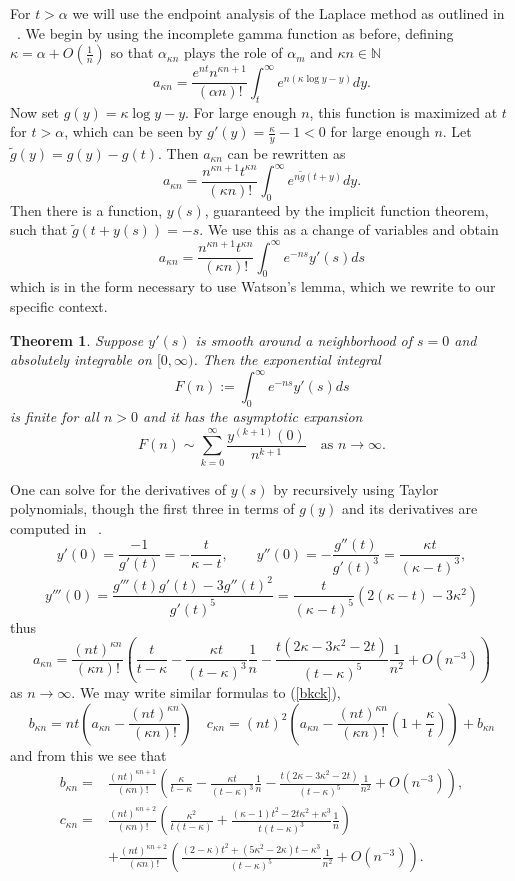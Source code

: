 \documentclass[12pt]{amsart}
\newtheorem{theorem}{Theorem}
\theoremstyle{remark}
\begin{document}
For $t>\alpha$ we will use the endpoint analysis of the Laplace method as outlined in ~\cite[\S3.3]{Miller}.  We begin by using the incomplete gamma function as before, defining $\kappa=\alpha+O(\frac{1}{n})$ so that $\alpha_{\kappa n}$ plays the role of $\alpha_m$ and $\kappa n\in\mathbb{N}$
\[a_{\kappa n}=\frac{e^{nt}n^{\kappa n+1}}{(\alpha n)!}\int_{t}^\infty e^{n(\kappa\log y-y)}dy.\]
Now set $g(y)=\kappa\log y-y$.  For large enough $n$, this function is maximized at $t$ for $t>\alpha$, which can be seen by $g'(y)=\frac{\kappa}{y}-1<0$ for large enough $n$.  Let $\tilde{g}(y)=g(y)-g(t)$.  Then $a_{\kappa n}$ can be rewritten as
\[a_{\kappa n}=\frac{n^{\kappa n+1}t^{\kappa n}}{(\kappa n)!}\int_{0}^\infty e^{n\tilde{g}(t+y)}dy.\]
Then there is a function, $y(s)$, guaranteed by the implicit function theorem, such that $\tilde{g}(t+y(s))=-s$.  We use this as a change of variables and obtain
\[a_{\kappa n}=\frac{n^{\kappa n+1}t^{\kappa n}}{(\kappa n)!}\int_{0}^\infty e^{-ns}y'(s)ds\]
which is in the form necessary to use Watson's lemma, which we rewrite to our specific context.
\begin{theorem}
	Suppose $y'(s)$ is smooth around a neighborhood of $s=0$ and absolutely integrable on $[0,\infty)$.  Then the 
	exponential integral
	\[F(n):=\int_0^\infty e^{-ns}y'(s)ds\]
	is finite for all $n>0$ and it has the asymptotic expansion
	\[F(n)\sim\sum_{k=0}^\infty\frac{y^{(k+1)}(0)}
	{n^{k+1}}\quad\text{as $n\rightarrow\infty$.}\]
\end{theorem}
One can solve for the derivatives of $y(s)$ by recursively using Taylor polynomials, though the first three in terms of $g(y)$ and its derivatives are computed in ~\cite{Miller}.
\[y'(0)=\frac{-1}{g'(t)}=-\frac{t}{\kappa-t},\qquad y''(0)=-\frac{g''(t)}{g'(t)^3}=\frac{\kappa t}{(\kappa-t)^3},\]
\[y'''(0)=\frac{g'''(t)g'(t)-3g''(t)^2}{g'(t)^5}=\frac{t}{(\kappa-t)^5}\left(2(\kappa-t)-3\kappa^2\right)\]
thus
\begin{equation}\label{Milleran}
	a_{\kappa n}=\frac{(nt)^{\kappa n}}{(\kappa n)!}
	\left(\frac{t}{t-\kappa}-\frac{\kappa t}{(t-\kappa)^3}\frac{1}{n}
	-\frac{t(2\kappa-3\kappa^2-2t)}{(t-\kappa)^5}\frac{1}{n^2}+O(n^{-3})\right)
\end{equation}
as $n\rightarrow\infty$.  We may write similar formulas to (\ref{bkck}),
\[b_{\kappa n}=nt\left(a_{\kappa n}-\frac{(nt)^{\kappa n}}{(\kappa n)!}\right)\quad c_{\kappa n}=(nt)^2\left(a_{\kappa n}-\frac{(nt)^{\kappa n}}{(\kappa n)!}\left(1+\frac{\kappa}{t}\right)\right)+b_{\kappa n}\]
and from this we see that
\begin{align}
	b_{\kappa n}=&\frac{(nt)^{\kappa n+1}}{(\kappa n)!}
		\left(\frac{\kappa}{t-\kappa}-\frac{\kappa t}{(t-\kappa)^3}\frac{1}{n}
		-\frac{t(2\kappa-3\kappa^2-2t)}{(t-\kappa)^5}\frac{1}{n^2}
		+O(n^{-3})\right),	
		\label{Millerbn}
	\\c_{\kappa n}=&\frac{(nt)^{\kappa n+2}}{(\kappa n)!}
		\left(\frac{\kappa^2}{t(t-\kappa)}+\frac{(\kappa-1)t^2-2t\kappa^2
		+\kappa^3}{t(t-\kappa)^3}\frac{1}{n}\right)
		\label{Millercn}
	\\ &+\frac{(nt)^{\kappa n+2}}{(\kappa n)!}
		\left(\frac{(2-\kappa)t^2+(5\kappa^2-2\kappa) t-\kappa^3}{(t-\kappa)^5}
		\frac{1}{n^2}+O(n^{-3})\right).\nonumber
\end{align}
\end{document}
